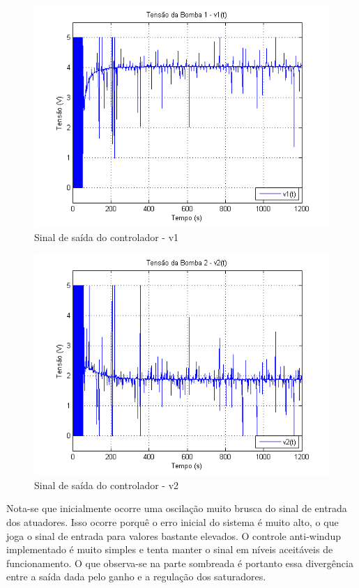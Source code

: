 \begin{figure}[H]
	\centering
	\includegraphics[height=0.35\paperheight ,keepaspectratio]{img/fm_u1_wind.png}
	\caption{\small Sinal de saída do controlador - v1 }
	\label{figFm_u1_wind}
\end{figure}

\begin{figure}[H]
	\centering
	\includegraphics[height=0.35\paperheight ,keepaspectratio]{img/fm_u2_wind.png}
	\caption{Sinal de saída do controlador - v2 }
	\label{figFm_u2_wind}
\end{figure}
Nota-se que inicialmente ocorre uma oscilação muito brusca do sinal de entrada dos atuadores. Isso ocorre porquê o erro inicial do sistema é muito alto, o que joga o sinal de entrada para valores bastante elevados. O controle anti-windup implementado é muito simples e tenta manter o sinal em níveis aceitáveis de funcionamento. O que observa-se na parte sombreada é portanto essa divergência entre a saída dada pelo ganho e a regulação dos saturadores.

